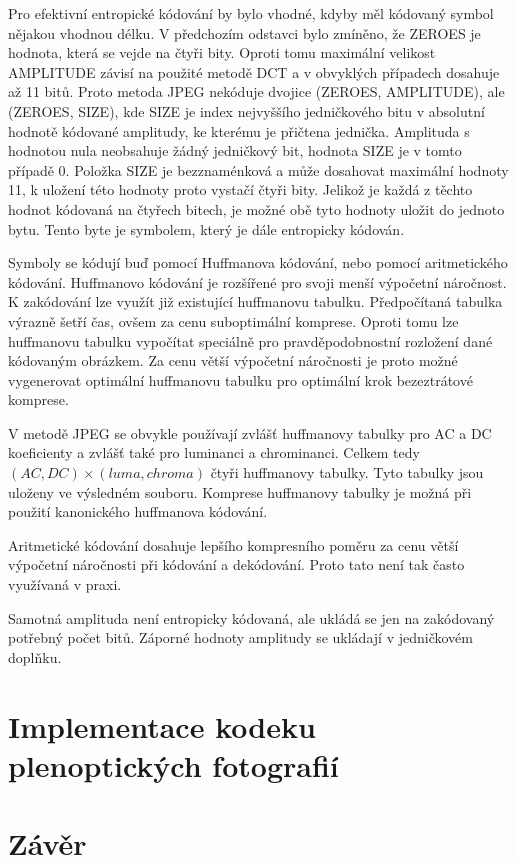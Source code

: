 Pro efektivní entropické kódování by bylo vhodné, kdyby měl kódovaný symbol nějakou vhodnou délku.
V předchozím odstavci bylo zmíněno, že ZEROES je hodnota, která se vejde na čtyři bity.
Oproti tomu maximální velikost AMPLITUDE závisí na použité metodě DCT a v obvyklých případech dosahuje až 11 bitů.
Proto metoda JPEG nekóduje dvojice (ZEROES, AMPLITUDE), ale (ZEROES, SIZE), kde SIZE je index nejvyššího jedničkového bitu v absolutní hodnotě kódované amplitudy, ke kterému je přičtena jednička.
Amplituda s hodnotou nula neobsahuje žádný jedničkový bit, hodnota SIZE je v tomto případě 0.
Položka SIZE je bezznaménková a může dosahovat maximální hodnoty 11, k uložení této hodnoty proto vystačí čtyři bity.
Jelikož je každá z těchto hodnot kódovaná na čtyřech bitech, je možné obě tyto hodnoty uložit do jednoto bytu.
Tento byte je symbolem, který je dále entropicky kódován.

Symboly se kódují buď pomocí Huffmanova kódování, nebo pomocí aritmetického kódování.
Huffmanovo kódování je rozšířené pro svoji menší výpočetní náročnost.
K zakódování lze využít již existující huffmanovu tabulku.
Předpočítaná tabulka výrazně šetří čas, ovšem za cenu suboptimální komprese.
Oproti tomu lze huffmanovu tabulku vypočítat speciálně pro pravděpodobnostní rozložení dané kódovaným obrázkem.
Za cenu větší výpočetní náročnosti je proto možné vygenerovat optimální huffmanovu tabulku pro optimální krok bezeztrátové komprese.

V metodě JPEG se obvykle používají zvlášť huffmanovy tabulky pro AC a DC koeficienty a zvlášť také pro luminanci a chrominanci.
Celkem tedy $(AC, DC)\times(luma, chroma)$ čtyři huffmanovy tabulky.
Tyto tabulky jsou uloženy ve výsledném souboru.
Komprese huffmanovy tabulky je možná při použití kanonického huffmanova kódování.

Aritmetické kódování dosahuje lepšího kompresního poměru za cenu větší výpočetní náročnosti při kódování a dekódování.
Proto tato není tak často využívaná v praxi.

Samotná amplituda není entropicky kódovaná, ale ukládá se jen na zakódovaný potřebný počet bitů.
Záporné hodnoty amplitudy se ukládají v jedničkovém doplňku.

\chapter{Implementace kodeku plenoptických fotografií}
\label{lfif-impl}

\chapter{Závěr}




